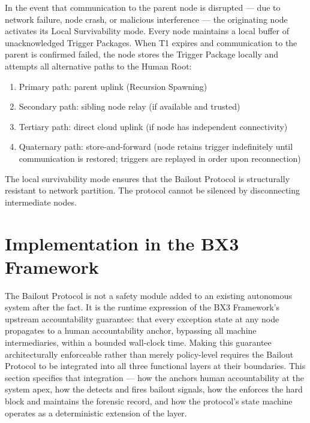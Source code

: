 In the event that communication to the parent node is disrupted — due to network failure, node crash, or malicious interference — the originating node activates its Local Survivability mode. Every node maintains a local buffer of unacknowledged Trigger Packages. When T1 expires and communication to the parent is confirmed failed, the node stores the Trigger Package locally and attempts all alternative paths to the Human Root:

\begin{enumerate}
  \item Primary path: parent uplink (Recursion Spawning)
  \item Secondary path: sibling node relay (if available and trusted)
  \item Tertiary path: direct cloud uplink (if node has independent connectivity)
  \item Quaternary path: store-and-forward (node retains trigger indefinitely until communication is restored; triggers are replayed in order upon reconnection)
\end{enumerate}

The local survivability mode ensures that the Bailout Protocol is structurally resistant to network partition. The protocol cannot be silenced by disconnecting intermediate nodes.

\section{Implementation in the BX3 Framework}
\label{sec:implementation}

The Bailout Protocol is not a safety module added to an existing autonomous system after the fact. It is the runtime expression of the BX3 Framework's upstream accountability guarantee: that every exception state at any node propagates to a human accountability anchor, bypassing all machine intermediaries, within a bounded wall-clock time. Making this guarantee architecturally enforceable rather than merely policy-level requires the Bailout Protocol to be integrated into all three functional layers at their boundaries. This section specifies that integration — how the \purpose{} anchors human accountability at the system apex, how the \bounds{} detects and fires bailout signals, how the \fact{} enforces the hard block and maintains the forensic record, and how the protocol's state machine operates as a deterministic extension of the \fact{} layer.

